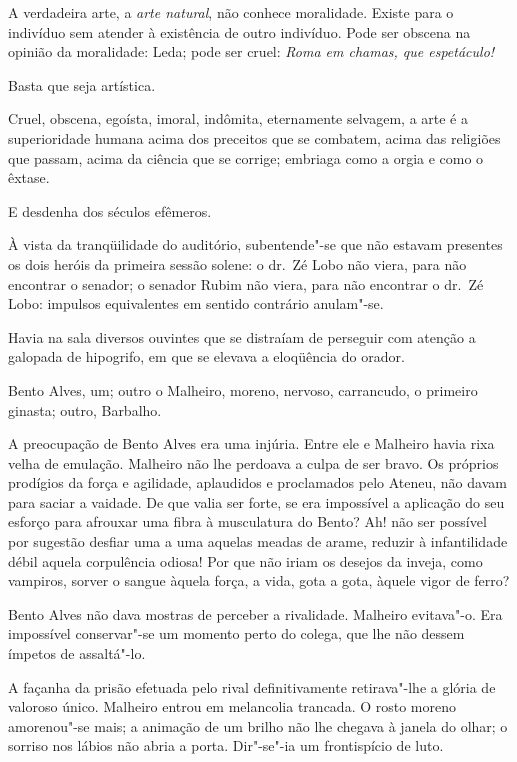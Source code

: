 A verdadeira arte, a \textit{arte natural}, não conhece
moralidade. Existe para o indivíduo sem atender à existência de outro
indivíduo. Pode ser obscena na opinião da moralidade: Leda; pode ser
cruel: \textit{Roma em chamas, que espetáculo!} 

Basta que seja artística. 

Cruel, obscena, egoísta, imoral, indômita, eternamente selvagem, a arte é a
superioridade humana acima dos preceitos que se combatem, acima das
religiões que passam, acima da ciência que se corrige; embriaga como a
orgia e como o êxtase. 

E desdenha dos séculos efêmeros. 

\noindent\dotfill

À vista da tranqüilidade do auditório, subentende"-se que não estavam presentes
os dois heróis da primeira sessão solene: o dr.~Zé Lobo não viera, para
não encontrar o senador; o senador Rubim não viera, para não encontrar
o dr.~Zé Lobo: impulsos equivalentes em sentido contrário anulam"-se.

Havia na sala diversos ouvintes que se distraíam de perseguir com
atenção a galopada de hipogrifo, em que se elevava a eloqüência do
orador. 

Bento Alves, um; outro o Malheiro, moreno, nervoso, carrancudo,
o primeiro ginasta; outro, Barbalho. 

A preocupação de Bento Alves era
uma injúria. Entre ele e Malheiro havia rixa velha de emulação.
Malheiro não lhe perdoava a culpa de ser bravo. Os próprios prodígios
da força e agilidade, aplaudidos e proclamados pelo Ateneu, não davam
para saciar a vaidade. De que valia ser forte, se era impossível a
aplicação do seu esforço para afrouxar uma fibra à musculatura do
Bento? Ah! não ser possível por sugestão desfiar uma a uma aquelas
meadas de arame, reduzir à infantilidade débil aquela corpulência
odiosa! Por que não iriam os desejos da inveja, como vampiros, sorver o
sangue àquela força, a vida, gota a gota, àquele vigor de ferro? 

Bento Alves não dava mostras de perceber a rivalidade. Malheiro evitava"-o.
Era impossível conservar"-se um momento perto do colega, que lhe não
dessem ímpetos de assaltá"-lo. 

A façanha da prisão efetuada pelo rival
definitivamente retirava"-lhe a glória de valoroso único. Malheiro
entrou em melancolia trancada. O rosto moreno amorenou"-se mais; a
animação de um brilho não lhe chegava à janela do olhar; o sorriso nos
lábios não abria a porta. Dir"-se"-ia um frontispício de luto. 

